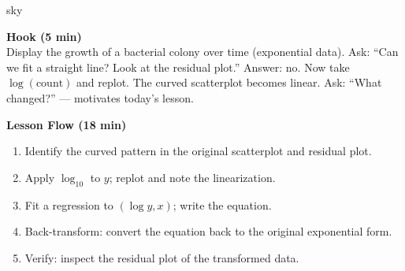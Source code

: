 \documentclass[10pt]{article}
\begin{document}
\begin{skillbox}{sky}
\begin{minipage}[t]{0.48\linewidth}
    \textbf{Hook (5 min)}\\
    Display the growth of a bacterial colony over time (exponential data). Ask: ``Can we fit a straight line? Look at the residual plot.'' Answer: no. Now take $\log(\text{count})$ and replot. The curved scatterplot becomes linear. Ask: ``What changed?'' --- motivates today's lesson.
\end{minipage}
\hfill
\begin{minipage}[t]{0.48\linewidth}
    \textbf{Lesson Flow (18 min)}
    \begin{enumerate}
        \item Identify the curved pattern in the original scatterplot and residual plot.
        \item Apply $\log_{10}$ to $y$; replot and note the linearization.
        \item Fit a regression to $(\log y, x)$; write the equation.
        \item Back-transform: convert the equation back to the original exponential form.
        \item Verify: inspect the residual plot of the transformed data.
    \end{enumerate}
\end{minipage}
\end{skillbox}
\end{document}
